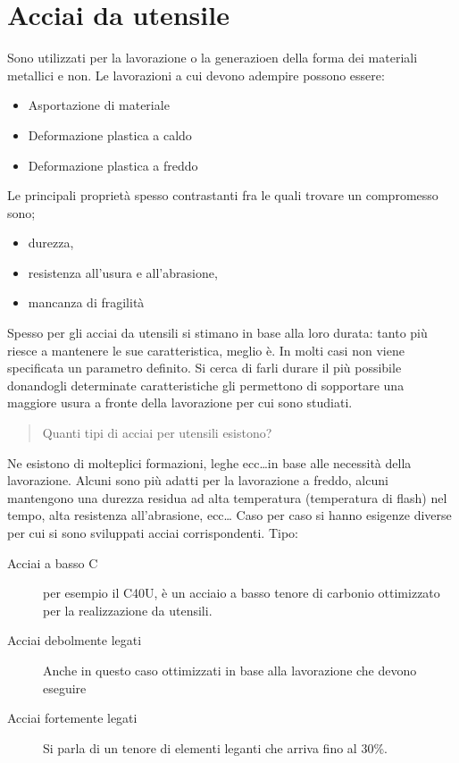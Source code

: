 \chapter{Acciai da utensile}\label{chp:Utensili}
Sono utilizzati per la lavorazione o la generazioen della forma dei materiali metallici e non.
Le lavorazioni a cui devono adempire possono essere:
\begin{itemize}
\item Asportazione di materiale
\item Deformazione plastica a caldo
\item Deformazione plastica a freddo
\end{itemize}

Le principali proprietà spesso contrastanti fra le quali trovare un compromesso sono;
\begin{itemize}
\item durezza,
\item resistenza all'usura e all'abrasione,
\item mancanza di fragilità
\end{itemize}

Spesso per gli acciai da utensili si stimano in base alla loro durata: tanto più riesce a mantenere le sue caratteristica, meglio è.
In molti casi non viene specificata un parametro definito. Si cerca di farli durare il più possibile donandogli determinate caratteristiche gli permettono di sopportare una maggiore usura a fronte della lavorazione per cui sono studiati.

\begin{quote}
Quanti tipi di acciai per utensili esistono?
\end{quote}

Ne esistono di molteplici formazioni, leghe ecc\dots in base alle necessità della lavorazione.
Alcuni sono più adatti per la lavorazione a freddo, alcuni mantengono una durezza residua ad alta temperatura (temperatura di flash) nel tempo, alta resistenza all'abrasione, ecc\dots
Caso per caso si hanno esigenze diverse per cui si sono sviluppati acciai corrispondenti.
Tipo:
\begin{description}
\item[Acciai a basso C] per esempio il C40U, è un acciaio a basso tenore di carbonio ottimizzato per la realizzazione da utensili.
\item[Acciai debolmente legati] Anche in questo caso ottimizzati in base alla lavorazione che devono eseguire
\item[Acciai fortemente legati] Si parla di un tenore di elementi leganti che arriva fino al 30\%.
\end{description}

